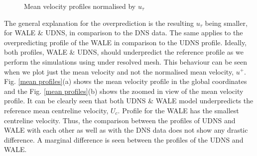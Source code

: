 %
\begin{figure}[h!]
\begin{minipage}[b]{0.5\textwidth}
\end{minipage}
%
\begin{minipage}[b]{0.5\textwidth}
\end{minipage}
\caption{Mean velocity profiles normalised by $u_\tau$}
\label{mean profiles udns vs wale wall coords}
\end{figure} 
%
The general explanation for the overprediction is the resulting $u_\tau$ being smaller, for WALE \& UDNS,  in comparison to the DNS data. The same applies to the overpredicting profile of the WALE in comparison to the UDNS profile. Ideally, both profiles, WALE \& UDNS, should underpredict the reference profile as we perform the simulations using under resolved mesh. This behaviour can be seen when we plot just the mean velocity and not the normalised mean velocity, $u^+$. Fig. \ref{mean profiles}(a) shows the mean velocity profile in the global coordinates and the Fig. \ref{mean profiles}(b) shows the zoomed in view of the mean velocity profile. It can be clearly seen that both UDNS \& WALE model underpredicts the reference mean centreline velocity, $U_c$. Profile for the WALE has the smallest centreline velocity. Thus, the comparison between the profiles of UDNS and WALE with each other as well as with the DNS data does not show any drastic difference. A marginal difference is seen between the profiles of the UDNS and WALE.

